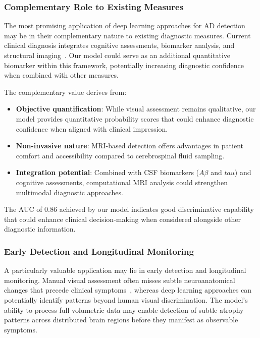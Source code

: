 \documentclass[12pt, a4paper]{article}
\begin{document}
\subsubsection{Complementary Role to Existing Measures}

The most promising application of deep learning approaches for AD detection may be in their complementary nature to existing diagnostic measures. Current clinical diagnosis integrates cognitive assessments, biomarker analysis, and structural imaging~\cite{dubois2007research}. Our model could serve as an additional quantitative biomarker within this framework, potentially increasing diagnostic confidence when combined with other measures.

The complementary value derives from:
\begin{itemize}
    \item \textbf{Objective quantification}: While visual assessment remains qualitative, our model provides quantitative probability scores that could enhance diagnostic confidence when aligned with clinical impression.
    
    \item \textbf{Non-invasive nature}: MRI-based detection offers advantages in patient comfort and accessibility compared to cerebrospinal fluid sampling.
    
    \item \textbf{Integration potential}: Combined with CSF biomarkers ($A\beta$ and $tau$) and cognitive assessments, computational MRI analysis could strengthen multimodal diagnostic approaches.
\end{itemize}

The AUC of 0.86 achieved by our model indicates good discriminative capability that could enhance clinical decision-making when considered alongside other diagnostic information.

\subsubsection{Early Detection and Longitudinal Monitoring}

A particularly valuable application may lie in early detection and longitudinal monitoring. Manual visual assessment often misses subtle neuroanatomical changes that precede clinical symptoms~\cite{vemuri2010role}, whereas deep learning approaches can potentially identify patterns beyond human visual discrimination. The model's ability to process full volumetric data may enable detection of subtle atrophy patterns across distributed brain regions before they manifest as observable symptoms.
\end{document}
